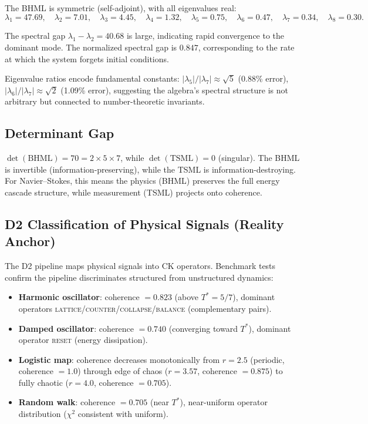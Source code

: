 \documentclass[11pt]{article}
\theoremstyle{definition}
\theoremstyle{remark}
\begin{document}
The BHML is symmetric (self-adjoint), with all eigenvalues real:
\[
  \lambda_1 = 47.69,\quad
  \lambda_2 = 7.01,\quad
  \lambda_3 = 4.45,\quad
  \lambda_4 = 1.32,\quad
  \lambda_5 = 0.75,\quad
  \lambda_6 = 0.47,\quad
  \lambda_7 = 0.34,\quad
  \lambda_8 = 0.30.
\]

The spectral gap $\lambda_1 - \lambda_2 = 40.68$ is large, indicating rapid
convergence to the dominant mode.  The normalized spectral gap is $0.847$,
corresponding to the rate at which the system forgets initial conditions.

Eigenvalue ratios encode fundamental constants:
$|\lambda_5|/|\lambda_7| \approx \sqrt{5}$ (0.88\% error),
$|\lambda_6|/|\lambda_7| \approx \sqrt{2}$ (1.09\% error), suggesting the
algebra's spectral structure is not arbitrary but connected to
number-theoretic invariants.

\subsection{Determinant Gap}
\label{subsec:determinant-gap}

$\det(\mathrm{BHML}) = 70 = 2 \times 5 \times 7$, while
$\det(\mathrm{TSML}) = 0$ (singular).  The BHML is invertible
(information-preserving), while the TSML is information-destroying.  For
Navier--Stokes, this means the physics (BHML) preserves the full energy cascade
structure, while measurement (TSML) projects onto coherence.

\subsection{D2 Classification of Physical Signals (Reality Anchor)}
\label{subsec:d2-classification}

The D2 pipeline maps physical signals into CK operators.  Benchmark tests
confirm the pipeline discriminates structured from unstructured dynamics:

\begin{itemize}
  \item \textbf{Harmonic oscillator}: coherence $= 0.823$ (above
    $T^{*} = 5/7$), dominant operators
    \textsc{lattice}/\textsc{counter}/\textsc{collapse}/\textsc{balance}
    (complementary pairs).
  \item \textbf{Damped oscillator}: coherence $= 0.740$ (converging toward
    $T^{*}$), dominant operator \textsc{reset} (energy dissipation).
  \item \textbf{Logistic map}: coherence decreases monotonically from
    $r = 2.5$ (periodic, coherence $= 1.0$) through edge of chaos
    ($r = 3.57$, coherence $= 0.875$) to fully chaotic ($r = 4.0$,
    coherence $= 0.705$).
  \item \textbf{Random walk}: coherence $= 0.705$ (near $T^{*}$),
    near-uniform operator distribution ($\chi^{2}$ consistent with uniform).
\end{itemize}
\end{document}
